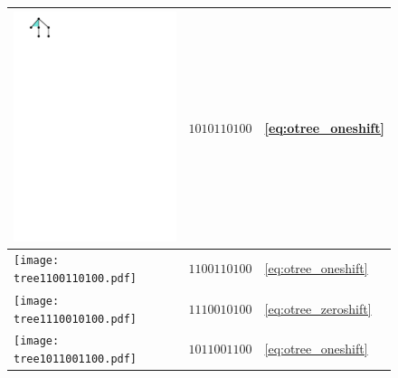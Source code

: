 \begin{figure}[ht]
\begin{minipage}[t]{0.325\linewidth}
\begin{tabular}{| m{} m{5em} m{} |}
\includegraphics[scale=0.25]{tree1010110100.pdf} & $1010110100$ & \eqref{eq:otree_oneshift}  \\ \hline
\texttt{[image: tree1100110100.pdf]} & $1100110100$ & \eqref{eq:otree_oneshift}  \\ \hline
\texttt{[image: tree1110010100.pdf]} & $1110010100$ & \eqref{eq:otree_zeroshift} \\ \hline
\texttt{[image: tree1011001100.pdf]} & $1011001100$ & \eqref{eq:otree_oneshift}  \\ \hline

\end{tabular}
\end{minipage}
\end{figure}
